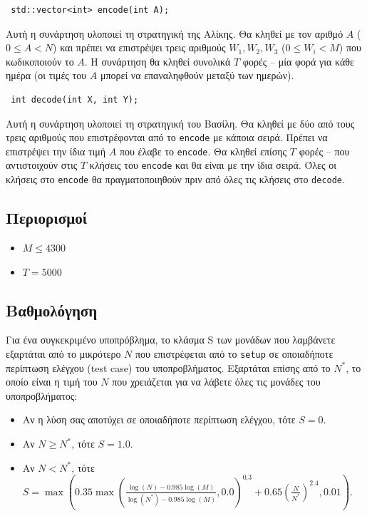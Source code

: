 \documentclass[12pt]{article}
\begin{document}
\begin{lstlisting}
 std::vector<int> encode(int A);
\end{lstlisting}

Αυτή η συνάρτηση υλοποιεί τη στρατηγική της Αλίκης. Θα κληθεί με τον αριθμό $A$ ($0 \leq A < N$) και πρέπει να επιστρέψει τρεις αριθμούς $W_1, W_2, W_3$ ($0 \leq W_i < M$) που κωδικοποιούν το $A$. Η συνάρτηση θα κληθεί συνολικά $T$ φορές -- μία φορά για κάθε ημέρα (οι τιμές του $A$ μπορεί να επαναληφθούν μεταξύ των ημερών).

\newpage

\begin{lstlisting}
 int decode(int X, int Y);
\end{lstlisting}

Αυτή η συνάρτηση υλοποιεί τη στρατηγική του Βασίλη. Θα κληθεί με δύο από τους τρεις αριθμούς που επιστρέφονται από το \texttt{encode} με κάποια σειρά. Πρέπει να επιστρέψει την ίδια τιμή $A$ που έλαβε το \texttt{encode}. Θα κληθεί επίσης $T$ φορές -- που αντιστοιχούν στις $T$ κλήσεις του \texttt{encode} και θα είναι με την ίδια σειρά. Όλες οι κλήσεις στο \texttt{encode} θα πραγματοποιηθούν πριν από όλες τις κλήσεις στο \texttt{decode}.

\subsection{Περιορισμοί}

\begin{itemize}
\item $M \leq 4300$
\item $T = 5000$
\end{itemize}

\subsection{Βαθμολόγηση}

Για ένα συγκεκριμένο υποπρόβλημα, το κλάσμα S των μονάδων που λαμβάνετε εξαρτάται από το μικρότερο $N$ που επιστρέφεται από το \texttt{setup} σε οποιαδήποτε περίπτωση ελέγχου (test case) του υποπροβλήματος. Εξαρτάται επίσης από το $N^*$, το οποίο είναι η τιμή του $N$ που χρειάζεται για να λάβετε όλες τις μονάδες του υποπροβλήματος:

\begin{itemize}
\item Αν η λύση σας αποτύχει σε οποιαδήποτε περίπτωση ελέγχου, τότε $S = 0$.
\item Αν $N \geq N^*$, τότε $S = 1.0$.
\item Αν $N < N^*$, τότε $S = \max\left(0.35 \max\left(\frac{\log(N) - 0.985 \log(M)}{\log(N^*) - 0.985 \log(M)}, 0.0\right)^{0.3} + 0.65 \left(\frac{N}{N^*}\right)^{2.4}, 0.01\right)$.
\end{itemize}
\end{document}
